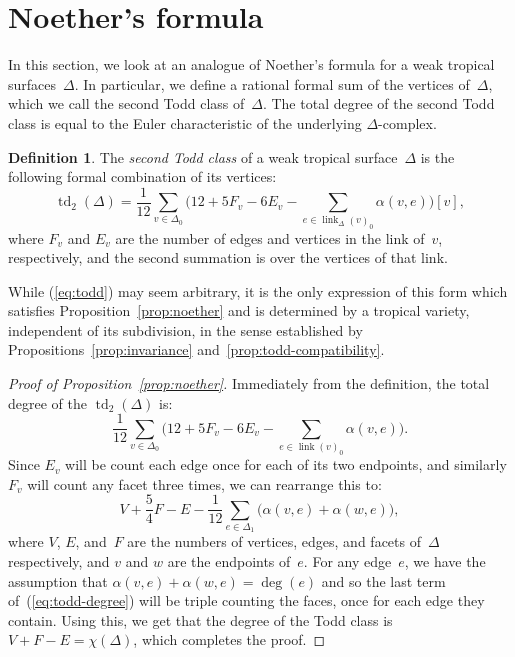 \documentclass[11pt]{amsart}
\theoremstyle{definition}
\newtheorem{defn}[thm]{Definition}
\newcommand{\defi}[1]{\emph{#1}}
\newcommand{\degree}{\operatorname{deg}}
\newcommand{\link}{\operatorname{link}}
\newcommand{\td}{\operatorname{td}}
\begin{document}
\section{Noether's formula}\label{sec:noether}

In this section, we look at an analogue of Noether's formula for a weak tropical
surfaces~$\Delta$. In particular, we define a rational formal sum of the
vertices of~$\Delta$, which we call the second Todd class of~$\Delta$. The total
degree of the second Todd class is equal to the Euler characteristic of the
underlying $\Delta$-complex.

\begin{defn}\label{def:todd}
The \defi{second Todd class} of a weak tropical surface~$\Delta$ is the
following formal combination of its vertices:
\begin{equation}\label{eq:todd}
\td_2(\Delta) = \frac{1}{12}\sum_{v \in \Delta_0} \Bigg(12 + 5 F_v - 6 E_v -
\sum_{e \in \link_\Delta(v)_0} \alpha(v, e) \Bigg) [v],
\end{equation}
where $F_v$ and $E_v$ are the number of edges and vertices in the link of~$v$,
respectively, and the second summation
is over the vertices of that link.
\end{defn}
While (\ref{eq:todd}) may seem arbitrary, it is the only expression of this form
which satisfies Proposition~\ref{prop:noether} and is determined by a tropical
variety, independent of its subdivision, in the sense established by
Propositions~\ref{prop:invariance} and~\ref{prop:todd-compatibility}.

\begin{proof}[Proof of Proposition~\ref{prop:noether}]
Immediately from the definition, the total degree of the $\td_2(\Delta)$ is:
\begin{equation*}
\frac{1}{12}\sum_{v \in \Delta_{0}} \Bigg(12 + 5 F_v - 6 E_v
- \sum_{e\in\link(v)_0} \alpha(v, e) \Bigg).
\end{equation*}
Since $E_v$ will be count each edge once for each of its two endpoints, and
similarly $F_v$ will count any facet three times, we can rearrange this to:
\begin{equation}\label{eq:todd-degree}
V + \frac{5}{4} F - E -
\frac{1}{12}\sum_{e \in \Delta_1} \big( \alpha(v, e) + \alpha(w, e) \big),
\end{equation}
where $V$, $E$, and~$F$ are the numbers of vertices, edges, and facets
of~$\Delta$ respectively, and $v$ and $w$ are the endpoints of~$e$. For any
edge~$e$, we have the assumption that $\alpha(v, e) + \alpha(w,e) = \degree(e)$
and so the last term of~(\ref{eq:todd-degree}) will be triple counting the faces, once for each edge they
contain. Using this, we get that the degree of the Todd class is $V + F - E =
\chi(\Delta)$, which completes the proof.
\end{proof}
\end{document}

